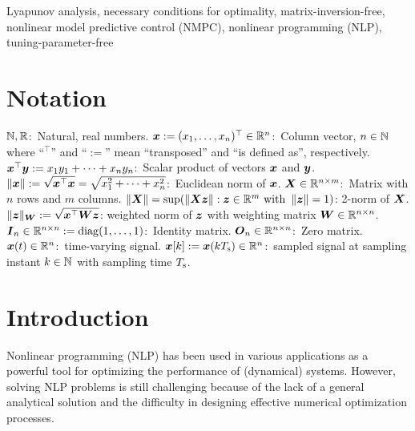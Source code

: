 \documentclass[journal]{IEEEtranTIE}
\begin{document}
\begin{IEEEkeywords}
Lyapunov analysis, necessary conditions for optimality, matrix-inversion-free, nonlinear model predictive control (NMPC), nonlinear programming (NLP), tuning-parameter-free
\end{IEEEkeywords}

{}




\section*{Notation}
$\mathbb{N}, \mathbb{R}$:~Natural, real numbers.  
$\boldsymbol{x} := (x_1, \dots, x_n)^\top\in \mathbb{R}^{n}$:~Column vector, $n \in \mathbb{N}$ where ``$^\top$'' and ``$:=$'' mean ``transposed'' and ``is defined as'', respectively. 
$\boldsymbol{x}^\top\boldsymbol{y} := x_1 y_1 + \dots + x_n y_n$:~Scalar product of vectors $\boldsymbol{x}$ and $\boldsymbol{y}$.
$\lVert \boldsymbol{x} \rVert :=\sqrt{\boldsymbol{x}^{\top}\boldsymbol{x}} = \sqrt{x_1^2 + \dots +x_n^2}$:~Euclidean norm  of $\boldsymbol{x}$.
$\boldsymbol{X} \in \mathbb{R}^{n \times m}$:~Matrix with $n$ rows and $m$ columns.
$\left\| \boldsymbol{X} \right\| = \sup(\left\| \boldsymbol{X}\boldsymbol{z} \right\|:\boldsymbol{z} \in \mathbb{R}^{m}~\rm{with}~\left\| \boldsymbol{z} \right\| = 1)$: 2-norm of $\boldsymbol{X}$.
$\lVert \boldsymbol{z} \rVert_{\boldsymbol{W}}:=\sqrt{\boldsymbol{x}^\top\boldsymbol{W}\boldsymbol{z}}$: weighted norm of $\boldsymbol{z}$ with weighting matrix $\boldsymbol{W} \in \mathbb{R}^{n \times n}$.
$\boldsymbol{I}_n \in \mathbb{R}^{n \times n} :=\operatorname*{diag}(1,\dots,1)$:~Identity matrix.
$\boldsymbol{O}_n \in \mathbb{R}^{n \times n}$:~Zero matrix. 
$\boldsymbol{x}(t)\in \mathbb{R}^{n}$:~time-varying signal. 
$\boldsymbol{x}[k]:=\boldsymbol{x}(kT_{\mathrm{s}})\in \mathbb{R}^{n}$:~sampled signal at sampling instant $k\in \mathbb{N}$ with sampling time $T_{\mathrm{s}}$. 


\section{Introduction}


Nonlinear programming (NLP) has been used in various applications as a powerful tool for optimizing the performance of (dynamical) systems\cite{betts2010practical,andersson2019casadi}. However, solving NLP problems is still challenging because of the lack of a general analytical solution and the difficulty in designing effective numerical optimization processes\cite{karamanakos2020model}. 
\end{document}
